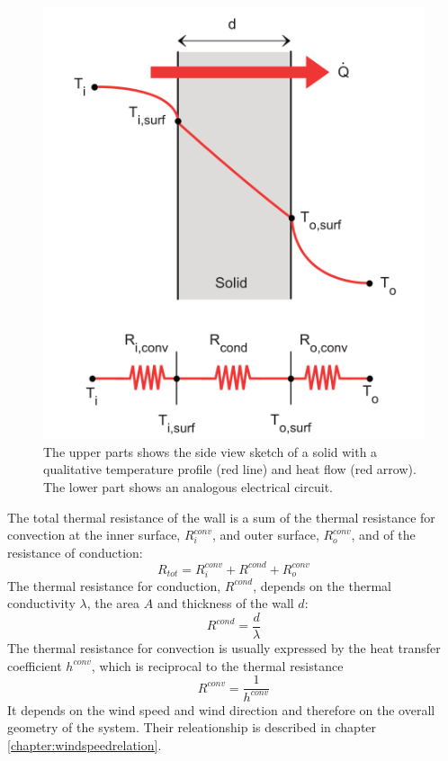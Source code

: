 \begin{figure} [H]
	\centering
	\includegraphics[scale=0.75]{Pictures/SimplePlate.png}
	\caption[SimplePlate]{The upper parts shows the side view sketch of a solid with a qualitative temperature profile (red line) and heat flow (red arrow). The lower part shows an analogous electrical circuit.}
	\label{fig:simpleplate}
\end{figure}

The total thermal resistance of the wall is a sum of the thermal resistance for convection at the inner surface, \(R_i^{conv}\), and outer surface, \(R_o^{conv}\), and of the resistance of conduction: 
\begin{equation}
R_{tot} =  R_i^{conv} + R^{cond} + R_o^{conv}
\end{equation}
The thermal resistance for conduction, \(R^{cond}\), depends on the thermal conductivity \(\lambda\), the area \(A\) and thickness of the wall \(d\):
\begin{equation}
R^{cond} =  \frac{d}{\lambda}
\end{equation}
The thermal resistance for convection is usually expressed by the heat transfer coefficient $h^{conv}$, which is reciprocal to the thermal resistance
\begin{equation}
R^{conv} =  \frac{1}{h^{conv}}
\end{equation}
It depends on the wind speed and wind direction and therefore on the overall geometry of the system. Their releationship is described in chapter \ref{chapter:windspeedrelation}.

